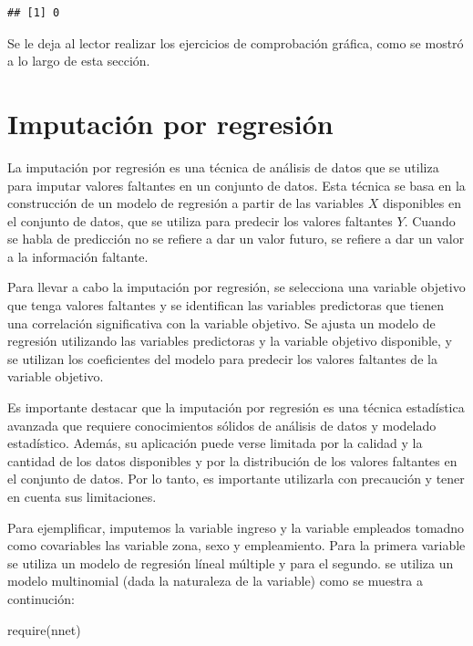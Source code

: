 \documentclass[
  12pt,
]{book}
\newenvironment{Shaded}{\begin{snugshade}}{\end{snugshade}}
\newcommand{\FunctionTok}[1]{\textcolor[rgb]{0.00,0.00,0.00}{#1}}
\newcommand{\NormalTok}[1]{#1}
\begin{document}
\begin{verbatim}
## [1] 0
\end{verbatim}

Se le deja al lector realizar los ejercicios de comprobación gráfica, como se mostró a lo largo de esta sección.

\hypertarget{imputaciuxf3n-por-regresiuxf3n}{%
\section{Imputación por regresión}\label{imputaciuxf3n-por-regresiuxf3n}}

La imputación por regresión es una técnica de análisis de datos que se utiliza para imputar valores faltantes en un conjunto de datos. Esta técnica se basa en la construcción de un modelo de regresión a partir de las variables \(X\) disponibles en el conjunto de datos, que se utiliza para predecir los valores faltantes \(Y\). Cuando se habla de predicción no se refiere a dar un valor futuro, se refiere a dar un valor a la información faltante.

Para llevar a cabo la imputación por regresión, se selecciona una variable objetivo que tenga valores faltantes y se identifican las variables predictoras que tienen una correlación significativa con la variable objetivo. Se ajusta un modelo de regresión utilizando las variables predictoras y la variable objetivo disponible, y se utilizan los coeficientes del modelo para predecir los valores faltantes de la variable objetivo.

Es importante destacar que la imputación por regresión es una técnica estadística avanzada que requiere conocimientos sólidos de análisis de datos y modelado estadístico. Además, su aplicación puede verse limitada por la calidad y la cantidad de los datos disponibles y por la distribución de los valores faltantes en el conjunto de datos. Por lo tanto, es importante utilizarla con precaución y tener en cuenta sus limitaciones.

Para ejemplificar, imputemos la variable ingreso y la variable empleados tomadno como covariables las variable zona, sexo y empleamiento. Para la primera variable se utiliza un modelo de regresión líneal múltiple y para el segundo. se utiliza un modelo multinomial (dada la naturaleza de la variable) como se muestra a continución:

\begin{Shaded}
\begin{Highlighting}[]
\FunctionTok{require}\NormalTok{(nnet)}
\end{Highlighting}
\end{Shaded}
\end{document}
